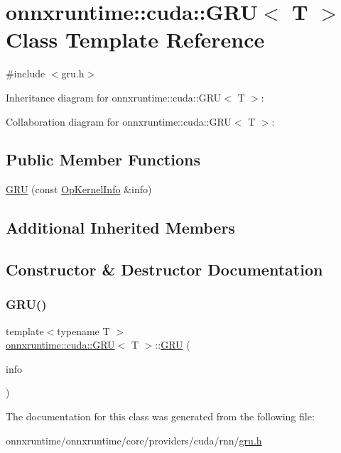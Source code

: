 \hypertarget{classonnxruntime_1_1cuda_1_1GRU}{}\section{onnxruntime\+:\+:cuda\+:\+:G\+RU$<$ T $>$ Class Template Reference}
\label{classonnxruntime_1_1cuda_1_1GRU}


{\ttfamily \#include $<$gru.\+h$>$}



Inheritance diagram for onnxruntime\+:\+:cuda\+:\+:G\+RU$<$ T $>$\+:


Collaboration diagram for onnxruntime\+:\+:cuda\+:\+:G\+RU$<$ T $>$\+:
\subsection*{Public Member Functions}
\begin{DoxyCompactItemize}
\item 
\mbox{\hyperlink{classonnxruntime_1_1cuda_1_1GRU_ab3d344cbf22f5b1ff1b175417dc0ce46}{G\+RU}} (const \mbox{\hyperlink{classonnxruntime_1_1OpKernelInfo}{Op\+Kernel\+Info}} \&info)
\end{DoxyCompactItemize}
\subsection*{Additional Inherited Members}


\subsection{Constructor \& Destructor Documentation}
\mbox{\label{classonnxruntime_1_1cuda_1_1GRU_ab3d344cbf22f5b1ff1b175417dc0ce46}} 
\subsubsection{\texorpdfstring{G\+R\+U()}{GRU()}}
{\footnotesize\ttfamily template$<$typename T $>$ \\
\mbox{\hyperlink{classonnxruntime_1_1cuda_1_1GRU}{onnxruntime\+::cuda\+::\+G\+RU}}$<$ T $>$\+::\mbox{\hyperlink{classonnxruntime_1_1cuda_1_1GRU}{G\+RU}} (\begin{DoxyParamCaption}\item[{const \mbox{\hyperlink{classonnxruntime_1_1OpKernelInfo}{Op\+Kernel\+Info}} \&}]{info }\end{DoxyParamCaption})\hspace{0.3cm}{\ttfamily [inline]}}



The documentation for this class was generated from the following file\+:\begin{DoxyCompactItemize}
\item 
onnxruntime/onnxruntime/core/providers/cuda/rnn/\mbox{\hyperlink{gru_8h}{gru.\+h}}\end{DoxyCompactItemize}
